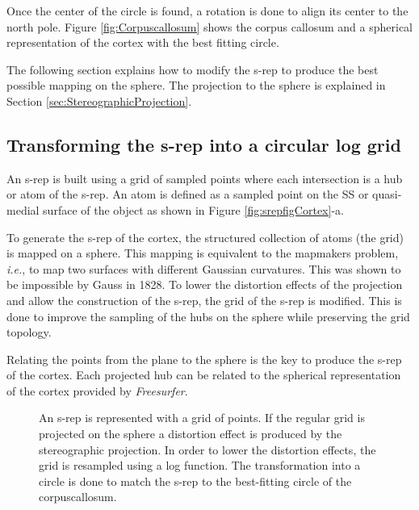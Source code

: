 Once the center of the circle is found, 
a rotation is done to align its center to the north pole. 
Figure \ref{fig:Corpuscallosum} shows the corpus callosum and a spherical representation 
of the cortex with the best fitting circle. 

The following section explains how to modify the s-rep 
to produce the best possible mapping on the sphere. 
The projection to the sphere is explained in Section \ref{sec:StereographicProjection}.

\subsection{Transforming the s-rep into a circular log grid}

An s-rep is built using a grid of sampled points where
each intersection is a hub or atom of the s-rep. 
An atom is defined as a sampled point on the SS or quasi-medial surface of the object as shown in Figure \ref{fig:srepfigCortex}-a.

To generate the s-rep of the cortex, the structured collection of atoms (the grid) is mapped on a sphere.
This mapping is equivalent to the mapmakers problem, \textit{i.e.}, to map two surfaces with
different Gaussian curvatures. This was shown to be impossible by Gauss in 1828.
To lower the distortion effects of the projection and allow the construction of the s-rep, 
the grid of the s-rep is modified.
This is done to improve the sampling of the hubs on the sphere while preserving the grid topology.

Relating the points from the plane to the sphere is the key to produce the s-rep of the cortex. 
Each projected hub can be related to the spherical representation of the cortex provided by \textit{Freesurfer}.

\begin{figure}[h!]
 \centering 
 \caption[Resampling of the s-rep.]{An s-rep is represented with a grid of points. If the regular grid is projected on the sphere
          a distortion effect is produced by the stereographic projection. In order to lower the distortion effects, the grid is resampled
          using a log function. The transformation into a circle is done to match the s-rep to the best-fitting circle of the corpuscallosum.}
 \label{fig:gridTransformation}  
\end{figure}

